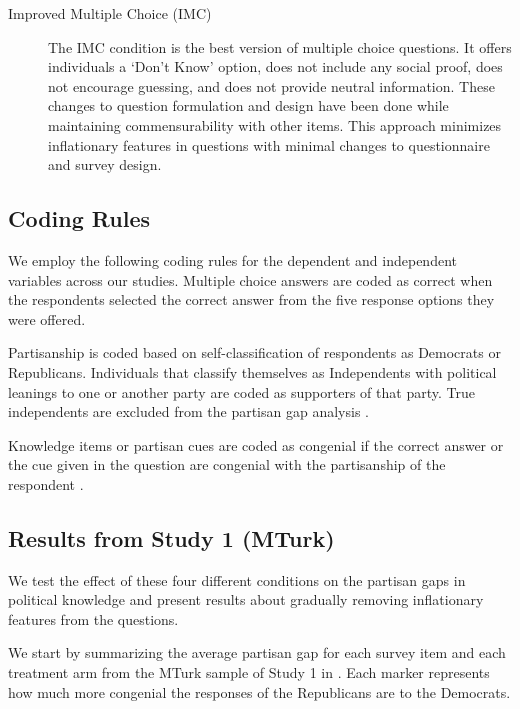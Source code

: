 \documentclass[12pt, letterpaper]{article}
\begin{document}
\begin{description}
		\item[Improved Multiple Choice (IMC)] \label{txt:IMC} The IMC condition is the best version of multiple choice questions. It offers individuals a `Don't Know' option, does not include any social proof, does not encourage guessing, and does not provide neutral information. These changes to question formulation and design have been done while maintaining commensurability with other items. This approach minimizes inflationary features in questions with minimal changes to questionnaire and survey design.
	\end{description}
	
	\subsection*{Coding Rules}
	
	
	We employ the following coding rules for the dependent and independent variables across our studies. Multiple choice answers are coded as correct when the respondents selected the correct answer from the five response options they were offered.
	
	
	
	Partisanship is coded based on self-classification of respondents as Democrats or Republicans. Individuals that classify themselves as Independents with political leanings to one or another party are coded as supporters of that party. True independents are excluded from the partisan gap analysis \citep{Bullock2011, klar2016independent}.
	
	Knowledge items or partisan cues are coded as congenial if the correct answer or the cue given in the question are congenial with the partisanship of the respondent \citep[see][]{prior2015you}.
	
	
	\subsection*{Results from Study 1 (MTurk)}
	We test the effect of these four different conditions on the partisan gaps in political knowledge and present results about gradually removing inflationary features from the questions.
	
	We start by summarizing the average partisan gap for each survey item and each treatment arm from the MTurk sample of Study 1 in . Each marker represents how much more congenial the responses of the Republicans are to the Democrats. 
	
\end{document}
